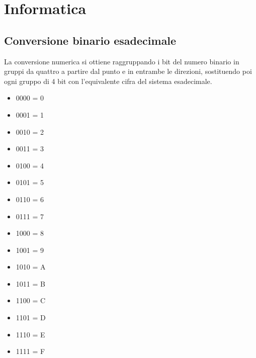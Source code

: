 \section{Informatica}
\subsection{Conversione binario esadecimale}
La conversione numerica si ottiene raggruppando i bit del numero binario in gruppi da quattro a partire dal punto e in entrambe le direzioni, sostituendo poi ogni gruppo di 4 bit con l'equivalente cifra del sistema esadecimale.
\begin{multicols}{2}
\begin{itemize}
    \item 0000 = 0
    \item 0001 = 1
    \item 0010 = 2
    \item 0011 = 3
    \item 0100 = 4
    \item 0101 = 5
    \item 0110 = 6
    \item 0111 = 7
    \item 1000 = 8
    \item 1001 = 9
    \item 1010 = A
    \item 1011 = B
    \item 1100 = C
    \item 1101 = D
    \item 1110 = E
    \item 1111 = F
\end{itemize}
\end{multicols}
